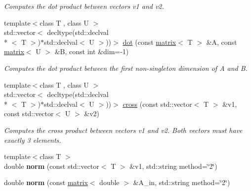 \begin{DoxyCompactItemize}
\begin{DoxyCompactList}\small\item\em Computes the dot product between vectors v1 and v2. \end{DoxyCompactList}\item 
\hypertarget{namespacekeycpp_ac3f44dfd7e58788078a8cba3696d3a39}{{\footnotesize template$<$class T , class U $>$ }\\std\-::vector$<$ decltype(std\-::declval\\*
$<$ T $>$)$\ast$std\-::declval$<$ U $>$))$>$ \hyperlink{namespacekeycpp_ac3f44dfd7e58788078a8cba3696d3a39}{dot} (const \hyperlink{classkeycpp_1_1matrix}{matrix}$<$ T $>$ \&A, const \hyperlink{classkeycpp_1_1matrix}{matrix}$<$ U $>$ \&B, const int \&dim=-\/1)}\label{namespacekeycpp_ac3f44dfd7e58788078a8cba3696d3a39}

\begin{DoxyCompactList}\small\item\em Computes the dot product between the first non-\/singleton dimension of A and B. \end{DoxyCompactList}\item 
\hypertarget{namespacekeycpp_a73fa9874e6923dd54c95d52a22a99d00}{{\footnotesize template$<$class T , class U $>$ }\\std\-::vector$<$ decltype(std\-::declval\\*
$<$ T $>$)$\ast$std\-::declval$<$ U $>$))$>$ \hyperlink{namespacekeycpp_a73fa9874e6923dd54c95d52a22a99d00}{cross} (const std\-::vector$<$ T $>$ \&v1, const std\-::vector$<$ U $>$ \&v2)}\label{namespacekeycpp_a73fa9874e6923dd54c95d52a22a99d00}

\begin{DoxyCompactList}\small\item\em Computes the cross product between vectors v1 and v2. Both vectors must have exactly 3 elements. \end{DoxyCompactList}\item 
\hypertarget{namespacekeycpp_a85adf7a8804f7d7d3c378d86427b4210}{{\footnotesize template$<$class T $>$ }\\double {\bfseries norm} (const std\-::vector$<$ T $>$ \&v1, std\-::string method=\char`\"{}2\char`\"{})}\label{namespacekeycpp_a85adf7a8804f7d7d3c378d86427b4210}

\item 
\hypertarget{namespacekeycpp_aeb34bdd249af3ce92341cdda62f95f65}{double {\bfseries norm} (const \hyperlink{classkeycpp_1_1matrix}{matrix}$<$ double $>$ \&A\-\_\-in, std\-::string method=\char`\"{}2\char`\"{})}\label{namespacekeycpp_aeb34bdd249af3ce92341cdda62f95f65}


\end{DoxyCompactItemize}
